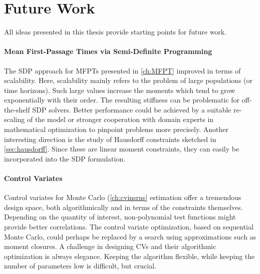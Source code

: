 \section{Future Work}
All ideas presented in this thesis provide starting points for future work.

\paragraph{Mean First-Passage Times via Semi-Definite Programming}
The \ac{SDP} approach for \acp{MFPT} presented in \autoref{ch:MFPT} improved in terms of scalability.
Here, scalability mainly refers to the problem of large populations (or time horizons).
Such large values increase the moments which tend to grow exponentially with their order.
The resulting stiffness can be problematic for off-the-shelf \ac{SDP} solvers.
Better performance could be achieved by a suitable re-scaling of the model or stronger cooperation with domain experts in mathematical optimization to pinpoint problems more precisely.
Another interesting direction is the study of Hausdorff constraints sketched in \autoref{sec:hausdorff}.
Since these are linear moment constraints, they can easily be incorporated into the \ac{SDP} formulation.

\paragraph{Control Variates}
Control variates for Monte Carlo (\autoref{ch:cvinsrns} estimation offer a tremendous design space, both algorithmically and in terms of the constraints themselves.
Depending on the quantity of interest, non-polynomial test functions might provide better correlations.
The control variate optimization, based on sequential Monte Carlo, could perhaps be replaced by a search using approximations such as moment closures.
A challenge in designing \acp{CV} and their algorithmic optimization is always elegance.
Keeping the algorithm flexible, while keeping the number of parameters low is difficult, but crucial.

